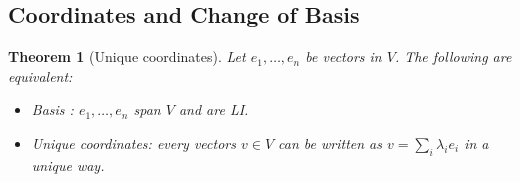 \documentclass{article}
\newtheorem{theorem}{Theorem}
\begin{document}
\subsection{Coordinates and Change of Basis}
\begin{theorem}[Unique coordinates]
    Let $e_1,\ldots,e_n$ be vectors in $V$. The following are equivalent:
    \begin{itemize}
        \item Basis : $e_1,\ldots,e_n$ span $V$ and are LI.
        \item Unique coordinates: every vectors $v\in V$ can be written as $v = \sum_i \lambda_i e_i$ in a unique way.
    \end{itemize}
\end{theorem}
\end{document}
